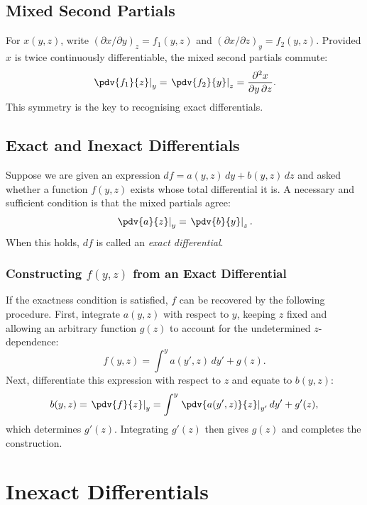 \subsection{Mixed Second Partials}

For $x(y, z)$, write $(\partial x/\partial y)_z = f_1(y,z)$ and $(\partial x/\partial z)_y = f_2(y,z)$. Provided $x$ is twice continuously differentiable, the mixed second partials commute:
\begin{equation}
    \left.\pdv{f_1}{z}\right|_y = \left.\pdv{f_2}{y}\right|_z = \frac{\partial^2 x}{\partial y\,\partial z}.
\end{equation}
This symmetry is the key to recognising exact differentials.

\subsection{Exact and Inexact Differentials}

Suppose we are given an expression $df = a(y,z)\,dy + b(y,z)\,dz$ and asked whether a function $f(y,z)$ exists whose total differential it is. A necessary and sufficient condition is that the mixed partials agree:
\begin{equation}
    \left.\pdv{a}{z}\right|_y = \left.\pdv{b}{y}\right|_z.
\end{equation}
When this holds, $df$ is called an \emph{exact differential}.

\subsubsection{Constructing $f(y,z)$ from an Exact Differential}

If the exactness condition is satisfied, $f$ can be recovered by the following procedure. First, integrate $a(y,z)$ with respect to $y$, keeping $z$ fixed and allowing an arbitrary function $g(z)$ to account for the undetermined $z$-dependence:
\begin{equation}
    f(y,z) = \int^y a(y', z)\,dy' + g(z).
\end{equation}
Next, differentiate this expression with respect to $z$ and equate to $b(y,z)$:
\begin{equation}
    b(y,z) = \left.\pdv{f}{z}\right|_y = \int^y \left.\pdv{a(y',z)}{z}\right|_{y'} dy' + g'(z),
\end{equation}
which determines $g'(z)$. Integrating $g'(z)$ then gives $g(z)$ and completes the construction.

\section{Inexact Differentials}

